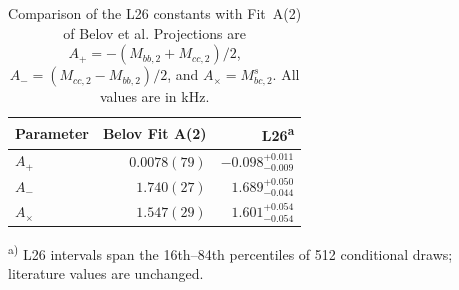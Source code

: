 \begin{table}
\begingroup
\caption{Comparison of the L26 constants with
Fit~A(2) of Belov et al.\cite{Belov2016}
Projections are $A_+=-(M_{bb,2}+M_{cc,2})/2$,
$A_-=(M_{cc,2}-M_{bb,2})/2$, and
$A_\times=M_{bc,2}^{s}$.
All values are in kHz.}
\label{tab:belov-combinations}
\centering\small
\begingroup\setlength{\tabcolsep}{7pt}\renewcommand{\arraystretch}{1.3}
\begin{tabular}{@{}lrr@{}}
\toprule
Parameter & Belov Fit A(2) & L26\textsuperscript{a}\\
\midrule
$A_+$ & $0.0078(79)$ & ${-0.098}_{-0.009}^{+0.011}$\\
$A_-$ & $1.740(27)$ & ${1.689}_{-0.044}^{+0.050}$\\
$A_\times$ & $1.547(29)$ & ${1.601}_{-0.054}^{+0.054}$\\
\bottomrule
\end{tabular}\endgroup
\par\vspace{3pt}
\par\vspace{3pt}\begin{minipage}{\linewidth}\footnotesize\raggedright\textsuperscript{a)} L26 intervals span the 16th--84th percentiles of 512 conditional draws; literature values are unchanged.\end{minipage}
\par\endgroup
\end{table}
